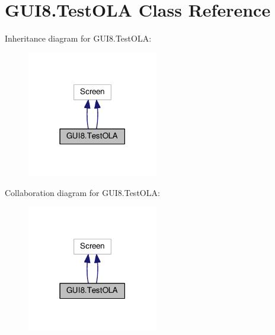 \hypertarget{classGUI8_1_1TestOLA}{}\section{G\+U\+I8.\+Test\+O\+LA Class Reference}
\label{classGUI8_1_1TestOLA}


Inheritance diagram for G\+U\+I8.\+Test\+O\+LA\+:\nopagebreak
\begin{figure}[H]
\begin{center}
\leavevmode
\includegraphics[width=162pt]{classGUI8_1_1TestOLA__inherit__graph}
\end{center}
\end{figure}


Collaboration diagram for G\+U\+I8.\+Test\+O\+LA\+:\nopagebreak
\begin{figure}[H]
\begin{center}
\leavevmode
\includegraphics[width=162pt]{classGUI8_1_1TestOLA__coll__graph}
\end{center}
\end{figure}
